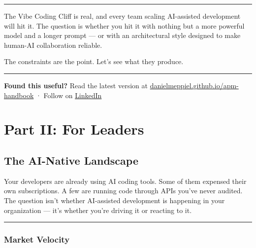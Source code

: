\documentclass[
  a4paper,
  DIV=11,
  numbers=noendperiod]{scrreprt}
\begin{document}
\begin{center}\rule{0.5\linewidth}{0.5pt}\end{center}

The Vibe Coding Cliff is real, and every team scaling AI-assisted
development will hit it. The question is whether you hit it with nothing
but a more powerful model and a longer prompt --- or with an
architectural style designed to make human-AI collaboration reliable.

The constraints are the point. Let's see what they produce.

\begin{center}\rule{0.5\linewidth}{0.5pt}\end{center}

\begin{tcolorbox}[enhanced jigsaw, arc=.35mm, bottomrule=.15mm, breakable, colback=white, colframe=quarto-callout-tip-color-frame, left=2mm, leftrule=.75mm, opacityback=0, rightrule=.15mm, toprule=.15mm]

\textbf{Found this useful?} Read the latest version at
\href{https://danielmeppiel.github.io/apm-handbook/}{danielmeppiel.github.io/apm-handbook}
· Follow on \href{https://www.linkedin.com/in/danielmeppiel/}{LinkedIn}

\end{tcolorbox}

\part{Part II: For Leaders}

\chapter{The AI-Native Landscape}\label{the-ai-native-landscape}

Your developers are already using AI coding tools. Some of them expensed
their own subscriptions. A few are running code through APIs you've
never audited. The question isn't whether AI-assisted development is
happening in your organization --- it's whether you're driving it or
reacting to it.

\begin{center}\rule{0.5\linewidth}{0.5pt}\end{center}

\section{Market Velocity}\label{market-velocity}
\end{document}
